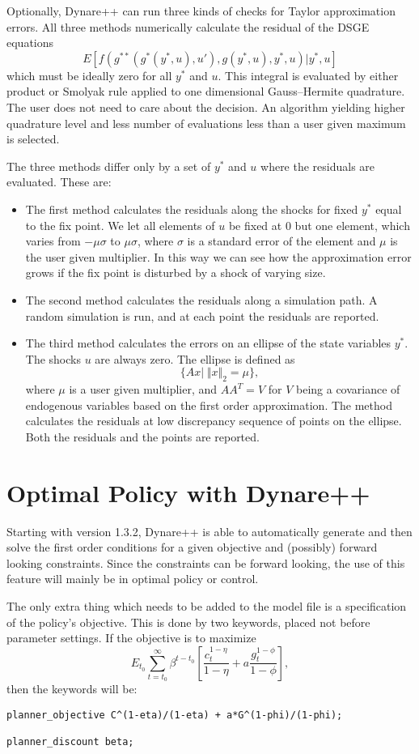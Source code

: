 \documentclass[10pt]{article}
\begin{document}
Optionally, Dynare++ can run three kinds of checks for Taylor
approximation errors. All three methods numerically calculate
the residual of the DSGE equations
\[
E[f(g^{**}(g^*(y^*,u),u'),g(y^*,u),y^*,u)|y^*,u]
\]
which must be ideally zero for all $y^*$ and $u$. This integral is
evaluated by either product or Smolyak rule applied to one dimensional
Gauss--Hermite quadrature. The user does not need to care about the
decision. An algorithm yielding higher quadrature level and less
number of evaluations less than a user given maximum is selected.

The three methods differ only by a set of $y^*$ and $u$ where the
residuals are evaluated. These are:
\begin{itemize}
\item The first method calculates the residuals along the shocks for
fixed $y^*$ equal to the fix point. We let all elements of $u$ be
fixed at $0$ but one element, which varies from $-\mu\sigma$ to
$\mu\sigma$, where $\sigma$ is a standard error of the element and
$\mu$ is the user given multiplier. In this way we can see how the
approximation error grows if the fix point is disturbed by a shock of
varying size.
\item The second method calculates the residuals along a simulation
path. A random simulation is run, and at each point the residuals are
reported.
\item The third method calculates the errors on an ellipse of the
state variables $y^*$. The shocks $u$ are always zero. The ellipse is
defined as
\[\{Ax|\; \Vert x\Vert_2=\mu\},\]
where $\mu$ is a user given multiplier, and $AA^T=V$ for $V$ being a
covariance of endogenous variables based on the first order
approximation. The method calculates the residuals at low discrepancy
sequence of points on the ellipse. Both the residuals and the points
are reported.
\end{itemize}

\section{Optimal Policy with Dynare++}
\label{optim}

Starting with version 1.3.2, Dynare++ is able to automatically
generate and then solve the first order conditions for a given
objective and (possibly) forward looking constraints. Since the
constraints can be forward looking, the use of this feature will
mainly be in optimal policy or control.

The only extra thing which needs to be added to the model file is a
specification of the policy's objective. This is done by two keywords,
placed not before parameter settings. If the objective is to maximize
$$E_{t_0}\sum_{t=t_0}^\infty\beta^{t-t_0}\left[\frac{c_t^{1-\eta}}{1-\eta}+
a\frac{g_t^{1-\phi}}{1-\phi}\right],$$
then the keywords will be:
{\small
\begin{verbatim}
planner_objective C^(1-eta)/(1-eta) + a*G^(1-phi)/(1-phi);

planner_discount beta;
\end{verbatim}
}
\end{document}
